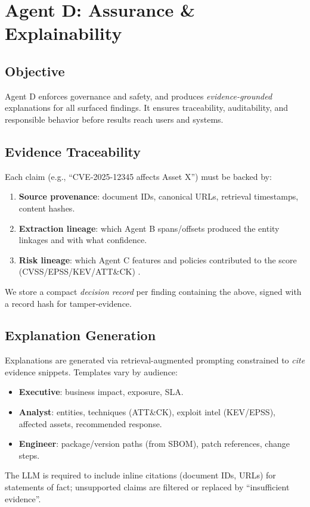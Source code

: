\section{Agent D: Assurance \& Explainability}
\label{sec:agentD}

\subsection{Objective}
Agent D enforces governance and safety, and produces \emph{evidence-grounded} explanations for all surfaced findings. It ensures traceability, auditability, and responsible behavior before results reach users and systems.

\subsection{Evidence Traceability}
Each claim (e.g., ``CVE-2025-12345 affects Asset X'') must be backed by:
\begin{enumerate}
  \item \textbf{Source provenance}: document IDs, canonical URLs, retrieval timestamps, content hashes.
  \item \textbf{Extraction lineage}: which Agent B spans/offsets produced the entity linkages and with what confidence.
  \item \textbf{Risk lineage}: which Agent C features and policies contributed to the score (CVSS/EPSS/KEV/ATT\&CK) \cite{cve_reference,epss_reference,cisa_kev,mitre_attack}.
\end{enumerate}
We store a compact \emph{decision record} per finding containing the above, signed with a record hash for tamper-evidence.

\subsection{Explanation Generation}
Explanations are generated via retrieval-augmented prompting constrained to \emph{cite} evidence snippets. Templates vary by audience:
\begin{itemize}
  \item \textbf{Executive}: business impact, exposure, SLA.
  \item \textbf{Analyst}: entities, techniques (ATT\&CK), exploit intel (KEV/EPSS), affected assets, recommended response.
  \item \textbf{Engineer}: package/version paths (from SBOM), patch references, change steps.
\end{itemize}
The LLM is required to include inline citations (document IDs, URLs) for statements of fact; unsupported claims are filtered or replaced by ``insufficient evidence''.

